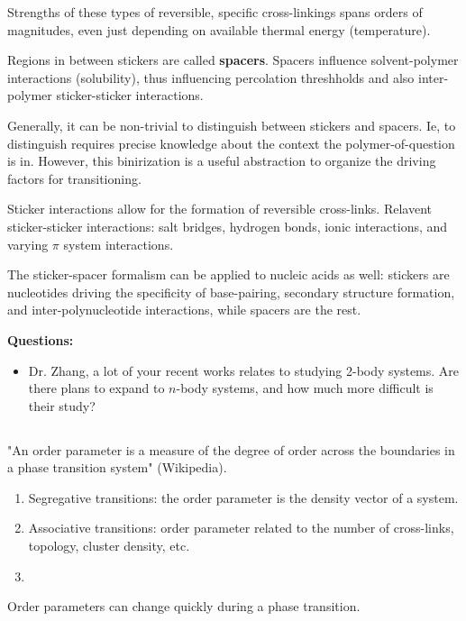 \documentclass{article}
\begin{document}
Strengths of these types of reversible, specific cross-linkings spans orders of magnitudes, even just depending on available thermal energy (temperature).

Regions in between stickers are called \textbf{spacers}. Spacers influence solvent-polymer interactions (solubility), thus influencing percolation threshholds and also inter-polymer sticker-sticker interactions.

Generally, it can be non-trivial to distinguish between stickers and spacers. Ie, to distinguish requires precise knowledge about the context the polymer-of-question is in. However, this binirization is a useful abstraction to organize the driving factors for transitioning.

Sticker interactions allow for the formation of reversible cross-links. Relavent sticker-sticker interactions: salt bridges, hydrogen bonds, ionic interactions, and varying $\pi$ system interactions.

The sticker-spacer formalism can be applied to nucleic acids as well: stickers are nucleotides driving the specificity of base-pairing, secondary structure formation, and inter-polynucleotide interactions, while spacers are the rest.

\textbf{Questions:}

\begin{itemize}
    \item Dr. Zhang, a lot of your recent works relates to studying 2-body systems. Are there plans to expand to $n$-body systems, and how much more difficult is their study?
\end{itemize}

\subsection{}

"An order parameter is a measure of the degree of order across the boundaries in a phase transition system" (Wikipedia).

\begin{enumerate}
    \item Segregative transitions: the order parameter is the density vector of a system.
    \item Associative transitions: order parameter related to the number of cross-links, topology, cluster density, etc.
    \item 
\end{enumerate}

Order parameters can change quickly during a phase transition.
\end{document}
